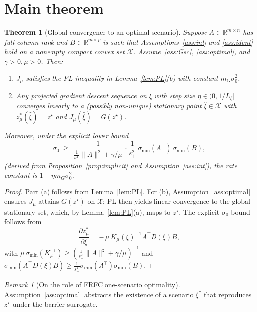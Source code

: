 \documentclass[11pt]{article}
\newtheorem{theorem}{Theorem}
\theoremstyle{remark}
\newtheorem{remark}{Remark}
\begin{document}
\section{Main theorem}
\begin{theorem}[Global convergence to an optimal scenario]
\label{thm:global}
Suppose $A\in\mathbb R^{m\times n}$ has full column rank and $B\in\mathbb R^{m\times p}$ is such that Assumptions~\ref{ass:int} and \ref{ass:ident} hold on a nonempty compact convex set $\mathcal X$. Assume~\ref{ass:Gsc}, \ref{ass:optimal}, and $\gamma>0,\mu>0$. Then:
\begin{enumerate}[leftmargin=2em,label=(\alph*)]
\item $J_\mu$ satisfies the PL inequality in Lemma~\ref{lem:PL}(b) with constant $m_G\sigma_0^2$.
\item Any projected gradient descent sequence on $\xi$ with step size $\eta\in(0,1/L_\xi]$ converges linearly to a (possibly non-unique) stationary point $\hat\xi\in\mathcal X$ with $z^*_\mu(\hat\xi)=z^\star$ and $J_\mu(\hat\xi)=G(z^\star)$.
\end{enumerate}
Moreover, under the explicit lower bound
\begin{equation*}
\sigma_0 \ \ge\ \frac{1}{\,\tfrac{1}{s_-^2}\|A\|^2+\gamma/\mu\,}\cdot \frac{1}{s_+^2}\,\sigma_{\min}(A^\top)\,\sigma_{\min}(B),
\end{equation*}
(derived from Proposition~\ref{prop:implicit} and Assumption~\ref{ass:int}), the rate constant is $1-\eta m_G\sigma_0^2$.
\end{theorem}
\begin{proof}
Part (a) follows from Lemma~\ref{lem:PL}. For (b), Assumption~\ref{ass:optimal} ensures $J_\mu$ attains $G(z^\star)$ on $\mathcal X$; PL then yields linear convergence to the global stationary set, which, by Lemma~\ref{lem:PL}(a), maps to $z^\star$.
The explicit $\sigma_0$ bound follows from
\begin{equation*}
\frac{\partial z^*_\mu}{\partial \xi}
= -\,\mu\,K_\mu(\xi)^{-1}A^\top D(\xi)B,
\end{equation*}
with $\mu\,\sigma_{\min}(K_\mu^{-1})\ge (\frac{1}{s_-^2}\|A\|^2+\gamma/\mu)^{-1}$ and $\sigma_{\min}(A^\top D(\xi)B)\ge \frac{1}{s_+^2}\sigma_{\min}(A^\top)\sigma_{\min}(B)$.
\end{proof}

\begin{remark}[On the role of FRFC one-scenario optimality]
Assumption~\ref{ass:optimal} abstracts the existence of a scenario $\xi^\dagger$ that reproduces $z^\star$ under the barrier surrogate.
\end{remark}
\end{document}
